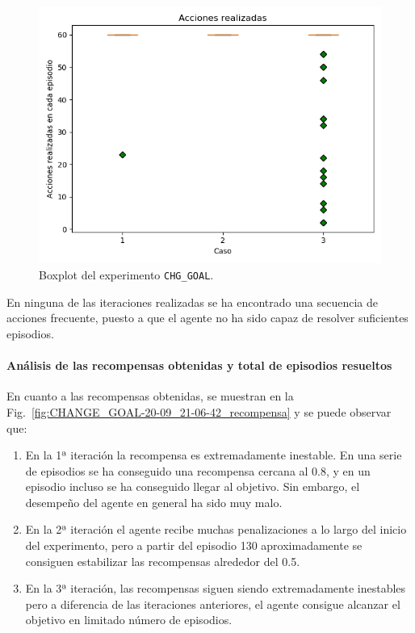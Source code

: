 \begin{figure}
    \centering
    \includegraphics[scale=0.4]{cap5_experimentacion/images/CHANGE_GOAL-20-09_21-06-42_boxplot.png}
    \caption{Boxplot del experimento \texttt{CHG\_GOAL}.}
    \label{fig:CHANGE_GOAL-20-09_21-06-42_boxplot}
\end{figure}

En ninguna de las iteraciones realizadas se ha encontrado una secuencia de acciones frecuente, puesto a que el agente no ha sido capaz de resolver suficientes episodios. 

\paragraph{Análisis de las recompensas obtenidas y total de episodios resueltos} 

En cuanto a las recompensas obtenidas, se muestran en la Fig.~\ref{fig:CHANGE_GOAL-20-09_21-06-42_recompensa} y se puede observar que: 
\begin{enumerate}
    \item En la 1ª iteración la recompensa es extremadamente inestable. En una serie de episodios se ha conseguido una recompensa cercana al 0.8, y en un episodio incluso se ha conseguido llegar al objetivo. Sin embargo, el desempeño del agente en general ha sido muy malo.  
    \item En la 2ª iteración el agente recibe muchas penalizaciones a lo largo del inicio del experimento, pero a partir del episodio 130 aproximadamente se consiguen estabilizar las recompensas alrededor del 0.5. 
    \item En la 3ª iteración, las recompensas siguen siendo extremadamente inestables pero a diferencia de las iteraciones anteriores, el agente consigue alcanzar el objetivo en limitado número de episodios. 
\end{enumerate}

